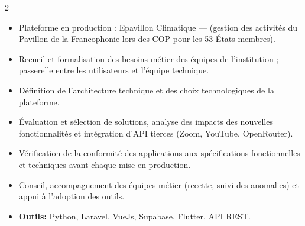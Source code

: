 \documentclass[10pt,a4paper,ragged2e,withhyper]{altacv}
\begin{document}
\begin{paracol}{2}
            \begin{itemize}
                \item Plateforme en production : Epavillon Climatique —  (gestion des activités du Pavillon de la Francophonie lors des COP pour les 53 États membres).
                \item Recueil et formalisation des besoins métier des équipes de l'institution ; passerelle entre les utilisateurs et l'équipe technique.
                \item Définition de l'architecture technique et des choix technologiques de la plateforme.
                \item Évaluation et sélection de solutions, analyse des impacts des nouvelles fonctionnalités et intégration d'API tierces (Zoom, YouTube, OpenRouter).
                \item Vérification de la conformité des applications aux spécifications fonctionnelles et techniques avant chaque mise en production.
                \item Conseil, accompagnement des équipes métier (recette, suivi des anomalies) et appui à l'adoption des outils.
                \item \textcolor{SecondaryColor}{\textbf{Outils: }} Python, Laravel, VueJs, Supabase, Flutter, API REST.
            \end{itemize}
            \divider


\end{paracol}
\end{document}
